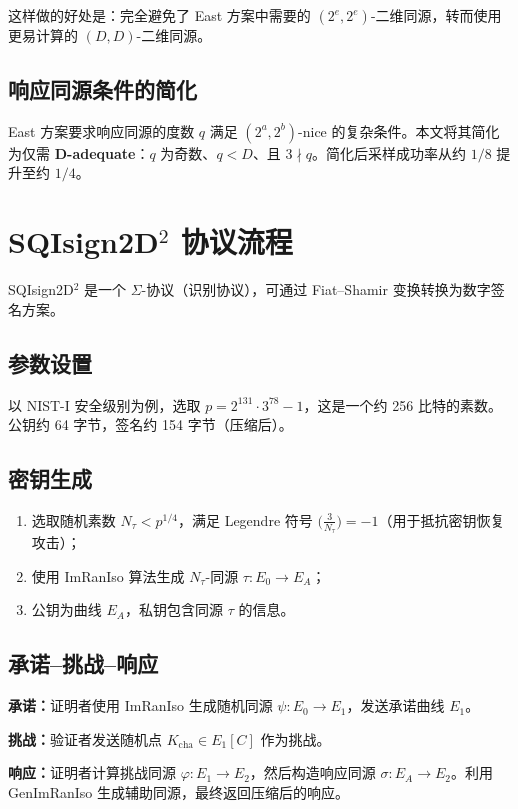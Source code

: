 \documentclass[12pt,a4paper]{ctexart}
\theoremstyle{remark}
\begin{document}
这样做的好处是：完全避免了 East 方案中需要的 $(2^e, 2^e)$-二维同源，转而使用更易计算的 $(D,D)$-二维同源。

\subsection{响应同源条件的简化}

East 方案要求响应同源的度数 $q$ 满足 $(2^a, 2^b)$-nice 的复杂条件。本文将其简化为仅需 \textbf{D-adequate}：$q$ 为奇数、$q < D$、且 $3 \nmid q$。简化后采样成功率从约 $1/8$ 提升至约 $1/4$。

\section{SQIsign2D$^2$ 协议流程}

SQIsign2D$^2$ 是一个 $\Sigma$-协议（识别协议），可通过 Fiat--Shamir 变换转换为数字签名方案。

\subsection{参数设置}

以 NIST-I 安全级别为例，选取 $p = 2^{131} \cdot 3^{78} - 1$，这是一个约 256 比特的素数。公钥约 64 字节，签名约 154 字节（压缩后）。

\subsection{密钥生成}

\begin{enumerate}
  \item 选取随机素数 $N_\tau < p^{1/4}$，满足 Legendre 符号 $\bigl(\frac{3}{N_\tau}\bigr) = -1$（用于抵抗密钥恢复攻击）；
  \item 使用 ImRanIso 算法生成 $N_\tau$-同源 $\tau: E_0 \to E_A$；
  \item 公钥为曲线 $E_A$，私钥包含同源 $\tau$ 的信息。
\end{enumerate}

\subsection{承诺--挑战--响应}

\textbf{承诺：}证明者使用 ImRanIso 生成随机同源 $\psi: E_0 \to E_1$，发送承诺曲线 $E_1$。

\textbf{挑战：}验证者发送随机点 $K_{\text{cha}} \in E_1[C]$ 作为挑战。

\textbf{响应：}证明者计算挑战同源 $\varphi: E_1 \to E_2$，然后构造响应同源 $\sigma: E_A \to E_2$。利用 GenImRanIso 生成辅助同源，最终返回压缩后的响应。
\end{document}
